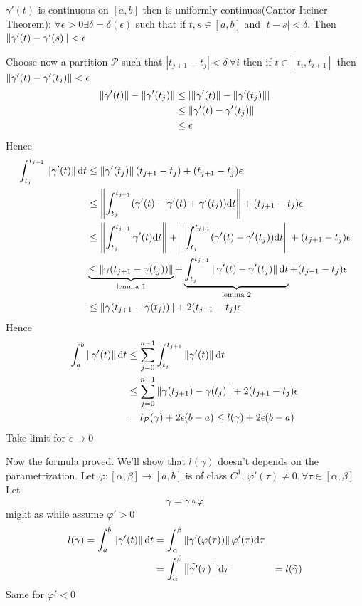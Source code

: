 \documentclass{book}
\newcommand{\abs}[1]{\left\lvert #1 \right\rvert}
\begin{document}
$\gamma'(t)$ is continuous on $[a,b]$ then is uniformly continuos(Cantor-Iteiner Theorem): $\forall \epsilon>0 \exists\delta=\delta(\epsilon)$ such that if $t,s\in [a,b]$ and
$\abs{t-s}<\delta$. Then $\left\lVert \gamma'(t)-\gamma'(s) \right\rVert<\epsilon$

Choose now a partition $\mathcal{P}$ such that $\abs{t_{j+1}-t_j}<\delta\ \forall i$ then if $t\in [t_{i},t_{i+1}]$ then$\left\lVert \gamma'(t)-\gamma'(t_j) \right\rVert<\epsilon$
$$\begin{aligned}
    \norm{\gamma'(t)}-\norm{\gamma'(t_j)} &\leq\abs{\norm{\gamma'(t)}-\norm{\gamma'(t_j)}}\\
    &\leq\norm{\gamma'(t)-\gamma'(t_j)}\\
    &\leq\epsilon
\end{aligned}$$
Hence
$$\begin{aligned}
    \int_{t_j}^{t_{j+1}}\left\lVert \gamma'(t) \right\rVert\text{d}t &\leq\left\lVert \gamma'(t_j) \right\rVert(t_{j+1}-t_j)+(t_{j+1}-t_j)\epsilon\\
    &\leq\left\lVert \int_{t_j}^{t_{j+1}}(\gamma'(t)-\gamma'(t)+\gamma'(t_j))\text{d}t \right\rVert+(t_{j+1}-t_j)\epsilon\\
    &\leq\left\lVert \int_{t_j}^{t_{j+1}}\gamma'(t)\text{d}t \right\rVert+\left\lVert \int_{t_j}^{t_{j+1}}(\gamma'(t)-\gamma'(t_j))\text{d}t \right\rVert+(t_{j+1}-t_j)\epsilon\\
    &\underbrace{\leq\left\lVert \gamma(t_{j+1}-\gamma(t_j)) \right\rVert}\limits_{\text{lemma 1}}+\underbrace{\int_{t_j}^{t_{j+1}}\left\lVert \gamma'(t)-\gamma'(t_j) \right\rVert\text{d}t}\limits_{\text{lemma 2}}+(t_{j+1}-t_j)\epsilon\\
    &\leq\left\lVert \gamma(t_{j+1}-\gamma(t_j)) \right\rVert+2(t_{j+1}-t_j)\epsilon
\end{aligned}$$
Hence 
$$
\begin{aligned}
    \int_a^b\left\lVert \gamma'(t) \right\rVert\text{d}t&\leq\sum\limits_{j=0}^{n-1}\int_{t_j}^{t_{j+1}}\left\lVert \gamma'(t) \right\rVert\text{d}t\\
&\leq\sum\limits_{j=0}^{n-1}\left\lVert \gamma(t_{j+1})-\gamma(t_j) \right\rVert+2(t_{j+1}-t_j)\epsilon\\
&=l_\mathcal{P}(\gamma)+2\epsilon(b-a)\leq l(\gamma)+2\epsilon(b-a)
\end{aligned}
$$
Take limit for $\epsilon\rightarrow0$

Now the formula proved. We'll show that $l(\gamma)$ doesn't depends on the parametrization. Let $\varphi:[\alpha,\beta]\rightarrow[a,b]$ is of class $C^1$, $\varphi'(\tau)\neq0,\forall\tau\in [\alpha,\beta]$ Let $$\tilde{\gamma}=\gamma\circ \varphi$$
might as while assume $\varphi'>0$
$$\begin{aligned}
    l(\gamma)=\int_a^b\left\lVert \gamma'(t) \right\rVert\text{d}t&=\int_{\alpha}^\beta\left\lVert \gamma'(\varphi(\tau)) \right\rVert\varphi'(\tau)\text{d}\tau\\
    &=\int_{\alpha}^\beta\left\lVert \tilde{\gamma'}(\tau) \right\rVert\text{d}\tau
    &=l(\tilde{\gamma})
\end{aligned}$$
Same for $\varphi'<0$
\end{document}
